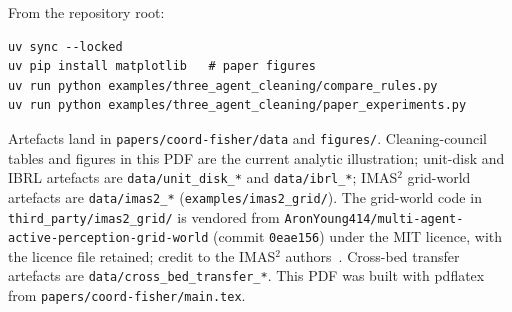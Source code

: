 \documentclass[11pt,a4paper]{article}
\begin{document}
From the repository root:
\begin{verbatim}
uv sync --locked
uv pip install matplotlib   # paper figures
uv run python examples/three_agent_cleaning/compare_rules.py
uv run python examples/three_agent_cleaning/paper_experiments.py
\end{verbatim}
Artefacts land in \texttt{papers/coord-fisher/data} and
\texttt{figures/}. Cleaning-council tables and figures in this PDF are the
current analytic illustration; unit-disk and IBRL artefacts are
\texttt{data/unit\_disk\_*} and \texttt{data/ibrl\_*}; IMAS$^2$ grid-world artefacts
are \texttt{data/imas2\_*} (\texttt{examples/imas2\_grid/}). The grid-world code
in \texttt{third\_party/imas2\_grid/} is vendored from
\texttt{AronYoung414/multi-agent-active-perception-grid-world} (commit
\texttt{0eae156}) under the MIT licence, with the licence file retained;
credit to the IMAS$^2$ authors~\citep{shi2026imas2}. Cross-bed transfer artefacts are \texttt{data/cross\_bed\_transfer\_*}.
This PDF was built with pdflatex from
\texttt{papers/coord-fisher/main.tex}.



\end{document}
